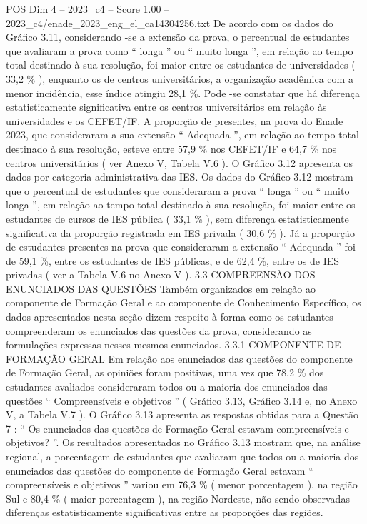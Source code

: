 \begin{textsample}{POS Dim 4 – 2023\_c4 – Score 1.00 – 2023\_c4/enade\_2023\_eng\_el\_ca14304256.txt}
De acordo com os dados do Gráfico 3.11, considerando -se a extensão da prova, o percentual de estudantes que avaliaram a prova como “ longa ” ou “ muito longa ”, em relação ao tempo total destinado à sua resolução, foi maior entre os estudantes de universidades ( 33,2 \% ), enquanto os de centros universitários, a organização acadêmica com a menor incidência, esse índice atingiu 28,1 \%.
Pode -se constatar que há diferença estatisticamente significativa entre os centros universitários em relação às universidades e os CEFET/IF.
A proporção de presentes, na prova do Enade 2023, que consideraram a sua extensão “ Adequada ”, em relação ao tempo total destinado à sua resolução, esteve entre 57,9 \% nos CEFET/IF e 64,7 \% nos centros universitários ( ver Anexo V, Tabela V.6 ).
O Gráfico 3.12 apresenta os dados por categoria administrativa das IES.
Os dados do Gráfico 3.12 mostram que o percentual de estudantes que consideraram a prova “ longa ” ou “ muito longa ”, em relação ao tempo total destinado à sua resolução, foi maior entre os estudantes de cursos de IES pública ( 33,1 \% ), sem diferença estatisticamente significativa da proporção registrada em IES privada ( 30,6 \% ).
Já a proporção de estudantes presentes na prova que consideraram a extensão “ Adequada ” foi de 59,1 \%, entre os estudantes de IES públicas, e de 62,4 \%, entre os de IES privadas ( ver a Tabela V.6 no Anexo V ). 3.3 COMPREENSÃO DOS ENUNCIADOS DAS QUESTÕES Também organizados em relação ao componente de Formação Geral e ao componente de Conhecimento Específico, os dados apresentados nesta seção dizem respeito à forma como os estudantes compreenderam os enunciados das questões da prova, considerando as formulações expressas nesses mesmos enunciados. 3.3.1 COMPONENTE DE FORMAÇÃO GERAL Em relação aos enunciados das questões do componente de Formação Geral, as opiniões foram positivas, uma vez que 78,2 \% dos estudantes avaliados consideraram todos ou a maioria dos enunciados das questões “ Compreensíveis e objetivos ” ( Gráfico 3.13, Gráfico 3.14 e, no Anexo V, a Tabela V.7 ).
O Gráfico 3.13 apresenta as respostas obtidas para a Questão 7 : “ Os enunciados das questões de Formação Geral estavam compreensíveis e objetivos? ”.
Os resultados apresentados no Gráfico 3.13 mostram que, na análise regional, a porcentagem de estudantes que avaliaram que todos ou a maioria dos enunciados das questões do componente de Formação Geral estavam “ compreensíveis e objetivos ” variou em 76,3 \% ( menor porcentagem ), na região Sul e 80,4 \% ( maior porcentagem ), na região Nordeste, não sendo observadas diferenças estatisticamente significativas entre as proporções das regiões.

\end{textsample}
